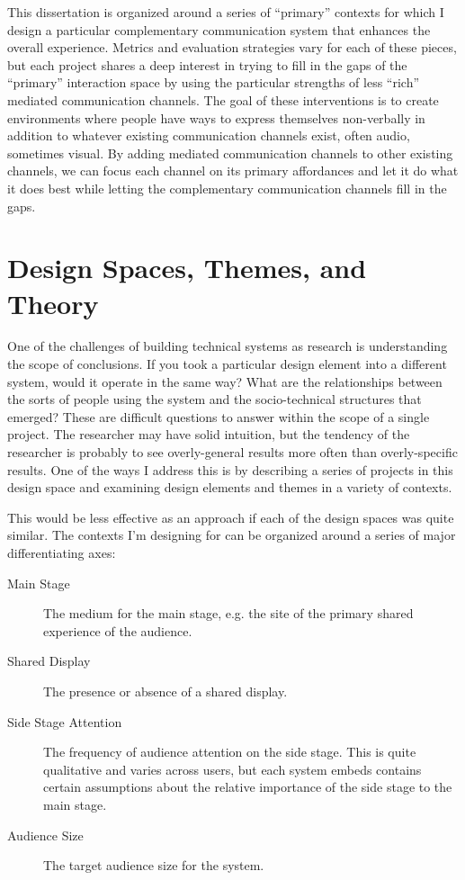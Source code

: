 This dissertation is organized around a series of ``primary'' contexts for which I design a particular complementary communication system that enhances the overall experience. Metrics and evaluation strategies vary for each of these pieces, but each project shares a deep interest in trying to fill in the gaps of the ``primary'' interaction space by using the particular strengths of less ``rich'' mediated communication channels. The goal of these interventions is to create environments where people have ways to express themselves non-verbally in addition to whatever existing communication channels exist, often audio, sometimes visual. By adding mediated communication channels to other existing channels, we can focus each channel on its primary affordances and let it do what it does best while letting the complementary communication channels fill in the gaps.



\section{Design Spaces, Themes, and Theory}

One of the challenges of building technical systems as research is understanding the scope of conclusions. If you took a particular design element into a different system, would it operate in the same way? What are the relationships between the sorts of people using the system and the socio-technical structures that emerged? These are difficult questions to answer within the scope of a single project. The researcher may have solid intuition, but the tendency of the researcher is probably to see overly-general results more often than overly-specific results. One of the ways I address this is by describing a series of projects in this design space and examining design elements and themes in a variety of contexts.

This would be less effective as an approach if each of the design spaces was quite similar. The contexts I'm designing for can be organized around a series of major differentiating axes:

\begin{description}
\item[Main Stage]{The medium for the main stage, e.g. the site of the primary shared experience of the audience.}
\item[Shared Display]{The presence or absence of a shared display.}
\item[Side Stage Attention]{The frequency of audience attention on the side stage. This is quite qualitative and varies across users, but each system embeds contains certain assumptions about the relative importance of the side stage to the main stage.}
\item[Audience Size]{The target audience size for the system.}
\end{description}

